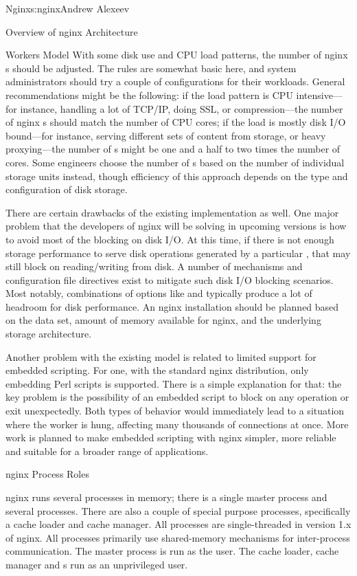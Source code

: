 \begin{aosachapter}{Nginx}{s:nginx}{Andrew Alexeev}
\begin{aosasect1}{Overview of nginx Architecture}
\begin{aosasect2}{Workers Model}
With some disk use and CPU load patterns, the number of nginx
s should be adjusted. The rules are somewhat basic here,
and system administrators should try a couple of configurations for
their workloads. General recommendations might be the following: if
the load pattern is CPU intensive---for instance, handling a lot of
TCP/IP, doing SSL, or compression---the number of nginx s
should match the number of CPU cores; if the load is mostly disk I/O
bound---for instance, serving different sets of content from storage,
or heavy proxying---the number of s might be one and a half
to two times the number of cores. Some engineers choose the number of
s based on the number of individual storage units
instead, though efficiency of this approach depends on the type and
configuration of disk storage.

There are certain drawbacks of the existing implementation as
well. One major problem that the developers of nginx will be solving
in upcoming versions is how to avoid most of the blocking on disk
I/O. At this time, if there is not enough storage performance to serve
disk operations generated by a particular , that
 may still block on reading/writing from disk. A number
of mechanisms and configuration file directives exist to mitigate such
disk I/O blocking scenarios. Most notably, combinations of options
like  and  typically produce a lot of
headroom for disk performance. An nginx installation should be planned
based on the data set, amount of memory available for nginx, and the
underlying storage architecture.

Another problem with the existing  model is related to
limited support for embedded scripting. For one, with the standard
nginx distribution, only embedding Perl scripts is supported. There is
a simple explanation for that: the key problem is the
possibility of an embedded script to block on any
operation or exit unexpectedly. Both types of behavior would
immediately lead to a situation where the worker is hung, affecting
many thousands of connections at once. More work is planned to make
embedded scripting with nginx simpler, more reliable and suitable for
a broader range of applications.

\end{aosasect2}

\begin{aosasect2}{nginx Process Roles}

nginx runs several processes in memory; there is a single master
process and several  processes. There are also a couple
of special purpose processes, specifically a cache loader and cache
manager. All processes are single-threaded in version 1.x of
nginx. All processes primarily use shared-memory mechanisms for
inter-process communication. The master process is run as the
 user. The cache loader, cache manager and s
run as an unprivileged user.


\end{aosasect2}
\end{aosasect1}
\end{aosachapter}
